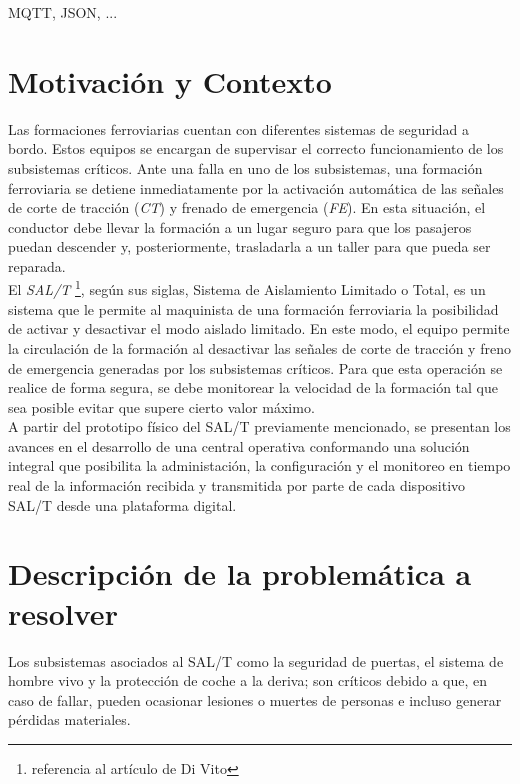 \documentclass[a4paper]{IEEEtran}
\begin{document}
\begin{IEEEkeywords}
MQTT, JSON, ...
\end{IEEEkeywords}


\section{Motivación y Contexto}

Las formaciones ferroviarias cuentan con diferentes sistemas de seguridad a bordo. Estos equipos se encargan de supervisar el correcto funcionamiento de los subsistemas críticos. Ante una falla en uno de los subsistemas, una formación ferroviaria se detiene inmediatamente por la activación automática de las señales de corte de tracción (\textit{CT}) y frenado de emergencia (\textit{FE}). En esta situación, el conductor debe llevar la formación a un lugar seguro para que los pasajeros puedan descender y, posteriormente, trasladarla a un taller para que pueda ser reparada.
\\

El \textit{SAL/T} \cite{b1} \footnote{referencia al artículo de Di Vito}, según sus siglas, Sistema de Aislamiento Limitado o Total, es un sistema que le permite al maquinista de una formación ferroviaria la posibilidad de activar y desactivar el modo aislado limitado. En este modo, el equipo permite la circulación de la formación al desactivar las señales de corte de tracción y freno de emergencia generadas por los subsistemas críticos. Para que esta operación se realice de forma segura, se debe monitorear la velocidad de la formación tal que sea posible evitar que supere cierto valor máximo.\\

A partir del prototipo físico del SAL/T previamente mencionado, se presentan los avances en el desarrollo de una central operativa conformando una solución integral que posibilita la administación, la configuración y el monitoreo en tiempo real de la información recibida y transmitida por parte de cada dispositivo SAL/T desde una plataforma digital.


\section{Descripción de la problemática a resolver}

Los subsistemas asociados al SAL/T como la seguridad de puertas, el sistema de hombre vivo y la protección de coche a la deriva; son críticos debido a que, en caso de fallar, pueden ocasionar lesiones o muertes de personas e incluso generar pérdidas materiales. 
\end{document}
